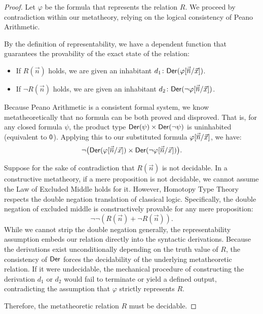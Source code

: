 \begin{proof}
    Let $\varphi$ be the formula that represents the relation $R$. We proceed by contradiction within our metatheory, relying on the logical consistency of Peano Arithmetic. 
    
    By the definition of representability, we have a dependent function that guarantees the provability of the exact state of the relation:
    \begin{itemize}
        \item If $R(\vec{n})$ holds, we are given an inhabitant $d_1 \colon \fun{Der}(\varphi[\vec{\num{n}}/\vec{x}])$.
        \item If $\neg R(\vec{n})$ holds, we are given an inhabitant $d_2 \colon \fun{Der}(\neg\varphi[\vec{\num{n}}/\vec{x}])$.
    \end{itemize}
    
    Because Peano Arithmetic is a consistent formal system, we know metatheoretically that no formula can be both proved and disproved. That is, for any closed formula $\psi$, the product type $\mathsf{Der}(\psi) \times \mathsf{Der}(\neg\psi)$ is uninhabited (equivalent to $\mathsf{0}$). Applying this to our substituted formula $\varphi[\vec{{\overline{n}}}/\vec{x}]$, we have:
    \[
        \neg\bigl(\mathsf{Der}(\varphi[\vec{{\overline{n}}}/\vec{x}]) \times \mathsf{Der}(\neg\varphi[\vec{{\overline{n}}}/\vec{x}])\bigr).
    \]
    
    Suppose for the sake of contradiction that $R(\vec{n})$ is not decidable. In a constructive metatheory, if a mere proposition is not decidable, we cannot assume the Law of Excluded Middle holds for it. However, Homotopy Type Theory respects the double negation translation of classical logic. Specifically, the double negation of excluded middle is constructively provable for any mere proposition:
    \[
        \neg\neg(R(\vec{n}) + \neg R(\vec{n})).
    \]
    While we cannot strip the double negation generally, the representability assumption embeds our relation directly into the syntactic derivations. Because the derivations exist unconditionally depending on the truth value of $R$, the consistency of $\mathsf{Der}$ forces the decidability of the underlying metatheoretic relation. If it were undecidable, the mechanical procedure of constructing the derivation $d_1$ or $d_2$ would fail to terminate or yield a defined output, contradicting the assumption that $\varphi$ strictly represents $R$. 
    
    Therefore, the metatheoretic relation $R$ must be decidable.
\end{proof}
        
